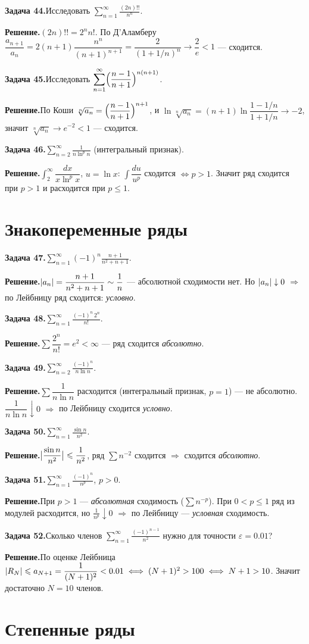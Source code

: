 \documentclass[10pt,a4paper]{article}
\newcommand{\eps}{\varepsilon}
\renewcommand{\le}{\leqslant}
\DeclarePairedDelimiter{\abs}{\lvert}{\rvert}
\theoremstyle{definition}
\theoremstyle{plain}
\newcommand{\writespace}{\vspace{7.5mm}}
\newcommand{\task}[2]{%
  \par\writespace\noindent
  \textbf{\textcolor{accent}{Задача #1.}}\enspace #2\par\smallskip}
\newcommand{\sol}{\par\noindent\textbf{Решение.}\enspace}
\begin{document}
\task{44}{Исследовать $\displaystyle\sum_{n=1}^\infty\frac{(2n)!!}{n^n}$.}
\sol $(2n)!!=2^n n!$. По Д'Аламберу
$\dfrac{a_{n+1}}{a_n}=2(n+1)\dfrac{n^n}{(n+1)^{n+1}}=\dfrac{2}{(1+1/n)^n}\to\dfrac2e<1$ — сходится.

\task{45}{Исследовать $\displaystyle\sum_{n=1}^\infty\Bigl(\frac{n-1}{n+1}\Bigr)^{n(n+1)}$.}
\sol По Коши $\sqrt[n]{a_n}=\Bigl(\dfrac{n-1}{n+1}\Bigr)^{n+1}$, и
$\ln\sqrt[n]{a_n}=(n+1)\ln\dfrac{1-1/n}{1+1/n}\to-2$, значит $\sqrt[n]{a_n}\to e^{-2}<1$ — сходится.

\task{46}{$\displaystyle\sum_{n=2}^\infty\frac1{n\ln^p n}$ (интегральный признак).}
\sol $\int_2^\infty\dfrac{dx}{x\ln^p x}$, $u=\ln x$: $\int\dfrac{du}{u^p}$ сходится $\iff p>1$.
Значит ряд сходится при $p>1$ и расходится при $p\le1$.

\section{Знакопеременные ряды}

\task{47}{$\displaystyle\sum_{n=1}^\infty(-1)^n\frac{n+1}{n^2+n+1}$.}
\sol $\abs{a_n}=\dfrac{n+1}{n^2+n+1}\sim\dfrac1n$ — абсолютной сходимости нет. Но $\abs{a_n}\downarrow0$
$\Rightarrow$ по Лейбницу ряд сходится: \emph{условно}.

\task{48}{$\displaystyle\sum_{n=1}^\infty\frac{(-1)^n\,2^n}{n!}$.}
\sol $\sum\dfrac{2^n}{n!}=e^2<\infty$ — ряд сходится \emph{абсолютно}.

\task{49}{$\displaystyle\sum_{n=2}^\infty\frac{(-1)^n}{n\ln n}$.}
\sol $\sum\dfrac1{n\ln n}$ расходится (интегральный признак, $p=1$) — не абсолютно. $\dfrac1{n\ln n}\downarrow0$
$\Rightarrow$ по Лейбницу сходится \emph{условно}.

\task{50}{$\displaystyle\sum_{n=1}^\infty\frac{\sin n}{n^2}$.}
\sol $\abs[\big]{\dfrac{\sin n}{n^2}}\le\dfrac1{n^2}$, ряд $\sum n^{-2}$ сходится $\Rightarrow$
сходится \emph{абсолютно}.

\task{51}{$\displaystyle\sum_{n=1}^\infty\frac{(-1)^n}{n^p}$, $p>0$.}
\sol При $p>1$ — \emph{абсолютная} сходимость ($\sum n^{-p}$). При $0<p\le1$ ряд из модулей
расходится, но $\tfrac1{n^p}\downarrow0$ $\Rightarrow$ по Лейбницу — \emph{условная} сходимость.

\task{52}{Сколько членов $\displaystyle\sum_{n=1}^\infty\frac{(-1)^{n-1}}{n^2}$ нужно для точности $\eps=0.01$?}
\sol По оценке Лейбница $\abs{R_N}\le a_{N+1}=\dfrac1{(N+1)^2}<0.01\iff(N+1)^2>100\iff N+1>10$.
Значит достаточно $N=10$ членов.

\section{Степенные ряды}
\end{document}
